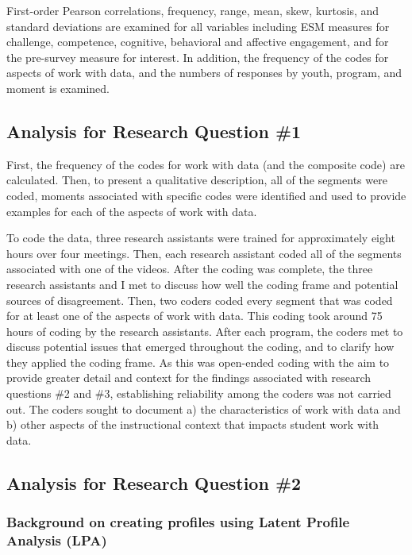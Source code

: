 \documentclass[]{msu-thesis}
\theoremstyle{definition}
\theoremstyle{definition}
\theoremstyle{definition}
\theoremstyle{remark}
\begin{document}
First-order Pearson correlations, frequency, range, mean, skew,
kurtosis, and standard deviations are examined for all variables
including ESM measures for challenge, competence, cognitive, behavioral
and affective engagement, and for the pre-survey measure for interest.
In addition, the frequency of the codes for aspects of work with data,
and the numbers of responses by youth, program, and moment is examined.

\subsection{Analysis for Research Question
\#1}\label{analysis-for-research-question-1}

First, the frequency of the codes for work with data (and the composite
code) are calculated. Then, to present a qualitative description, all of
the segments were coded, moments associated with specific codes were
identified and used to provide examples for each of the aspects of work
with data.

To code the data, three research assistants were trained for
approximately eight hours over four meetings. Then, each research
assistant coded all of the segments associated with one of the videos.
After the coding was complete, the three research assistants and I met
to discuss how well the coding frame and potential sources of
disagreement. Then, two coders coded every segment that was coded for at
least one of the aspects of work with data. This coding took around 75
hours of coding by the research assistants. After each program, the
coders met to discuss potential issues that emerged throughout the
coding, and to clarify how they applied the coding frame. As this was
open-ended coding with the aim to provide greater detail and context for
the findings associated with research questions \#2 and \#3,
establishing reliability among the coders was not carried out. The
coders sought to document a) the characteristics of work with data and
b) other aspects of the instructional context that impacts student work
with data.

\subsection{Analysis for Research Question
\#2}\label{analysis-for-research-question-2}

\subsubsection{Background on creating profiles using Latent Profile
Analysis
(LPA)}\label{background-on-creating-profiles-using-latent-profile-analysis-lpa}
\end{document}
